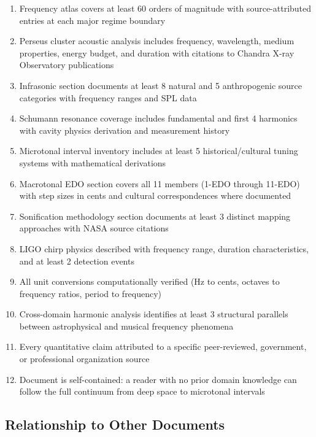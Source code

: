 \documentclass[11pt,letterpaper]{article}
\begin{document}
\begin{enumerate}[leftmargin=2em]
\item Frequency atlas covers at least 60 orders of magnitude with source-attributed entries at each major regime boundary
\item Perseus cluster acoustic analysis includes frequency, wavelength, medium properties, energy budget, and duration with citations to Chandra X-ray Observatory publications
\item Infrasonic section documents at least 8 natural and 5 anthropogenic source categories with frequency ranges and SPL data
\item Schumann resonance coverage includes fundamental and first 4 harmonics with cavity physics derivation and measurement history
\item Microtonal interval inventory includes at least 5 historical/cultural tuning systems with mathematical derivations
\item Macrotonal EDO section covers all 11 members (1-EDO through 11-EDO) with step sizes in cents and cultural correspondences where documented
\item Sonification methodology section documents at least 3 distinct mapping approaches with NASA source citations
\item LIGO chirp physics described with frequency range, duration characteristics, and at least 2 detection events
\item All unit conversions computationally verified (Hz to cents, octaves to frequency ratios, period to frequency)
\item Cross-domain harmonic analysis identifies at least 3 structural parallels between astrophysical and musical frequency phenomena
\item Every quantitative claim attributed to a specific peer-reviewed, government, or professional organization source
\item Document is self-contained: a reader with no prior domain knowledge can follow the full continuum from deep space to microtonal intervals
\end{enumerate}

\subsection{Relationship to Other Documents}
\end{document}

